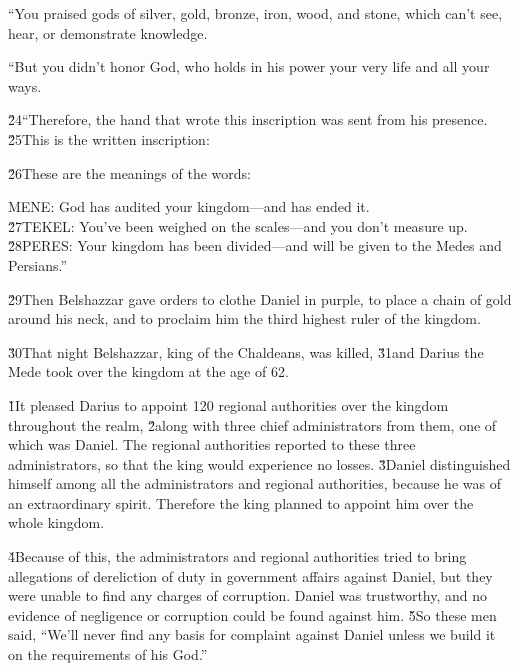 ``You praised gods of silver, gold, bronze, iron, wood, and stone, which can't see, hear, or demonstrate knowledge.

``But you didn't honor God, who holds in his power your very life and all your ways.

\v{24}``Therefore, the hand that wrote this inscription was sent from his presence. \v{25}This is the written inscription:


\v{26}These are the meanings of the words:

\begin{poetry}
\poeml MENE: God has audited your kingdom---and has ended it. \\
\poeml \v{27}TEKEL: You've been weighed on the scales---and you don't measure up. \\
\poeml \v{28}PERES: Your kingdom has been divided---and will be given to the Medes and Persians.''
\end{poetry}

\v{29}Then Belshazzar gave orders to clothe Daniel in purple, to place a chain of gold around his neck, and to proclaim him the third highest ruler of the kingdom.

\v{30}That night Belshazzar, king of the Chaldeans, was killed, \v{31}and Darius the Mede took over the kingdom at the age of 62.

\v{1}It pleased Darius to appoint 120 regional authorities over the kingdom throughout the realm, \v{2}along with three chief administrators from them, one of which was Daniel. The regional authorities reported to these three administrators, so that the king would experience no losses. \v{3}Daniel distinguished himself among all the administrators and regional authorities, because he was of an extraordinary spirit. Therefore the king planned to appoint him over the whole kingdom.

\v{4}Because of this, the administrators and regional authorities tried to bring allegations of dereliction of duty in government affairs against Daniel, but they were unable to find any charges of corruption. Daniel was trustworthy, and no evidence of negligence or corruption could be found against him. \v{5}So these men said, ``We'll never find any basis for complaint against Daniel unless we build it on the requirements of his God.''

